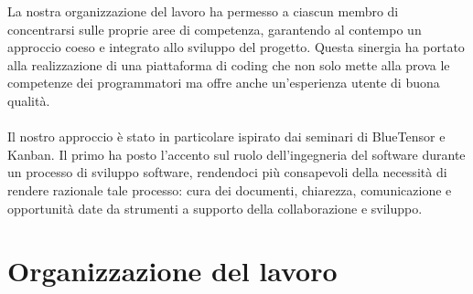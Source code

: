\documentclass[11pt, a4paper]{article}
\theoremstyle{definition}
\begin{document}
La nostra organizzazione del lavoro ha permesso a ciascun membro di concentrarsi sulle proprie aree di competenza, garantendo al contempo un approccio coeso e integrato allo sviluppo del progetto. Questa sinergia ha portato alla realizzazione di una piattaforma di coding che non solo mette alla prova le competenze dei programmatori ma offre anche un'esperienza utente di buona qualità.
\\\\
Il nostro approccio è stato in particolare ispirato dai seminari
di BlueTensor e Kanban. Il primo ha posto l'accento sul ruolo
dell'ingegneria del software durante un processo di sviluppo software,
rendendoci più consapevoli della necessità di rendere razionale
tale processo: cura dei documenti, chiarezza, comunicazione e opportunità
date da strumenti a supporto della collaborazione e sviluppo.




\section{Organizzazione del lavoro}
\end{document}
